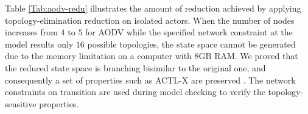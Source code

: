 %
%
Table \ref{Tab:aodv-redu} illustrates the amount of reduction achieved by applying topology-elimination reduction on isolated actors. When the number of nodes increases from $4$ to $5$ for AODV while the specified network constraint at the model results only $16$ possible topologies, the state space cannot be generated due to the memory limitation on a computer with $8${GB} {RAM}.  We proved that the reduced state space is branching bisimilar to the
original one, and consequently a set of properties such as {ACTL-X} are preserved \cite{FOAC}. The network constraints on transition are used during model checking \cite{FORM,CSI2018} to verify the topology-sensitive properties. 

